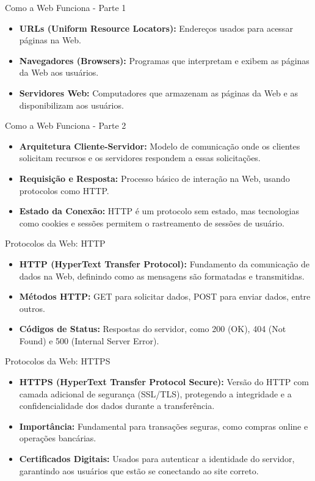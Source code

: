 \begin{frame}{Como a Web Funciona - Parte 1}
  \begin{itemize}
    \item \textbf{URLs (Uniform Resource Locators):} Endereços usados para acessar páginas na Web.
    \item \textbf{Navegadores (Browsers):} Programas que interpretam e exibem as páginas da Web aos usuários.
    \item \textbf{Servidores Web:} Computadores que armazenam as páginas da Web e as disponibilizam aos usuários.
  \end{itemize}
\end{frame}

\begin{frame}{Como a Web Funciona - Parte 2}
  \begin{itemize}
    \item \textbf{Arquitetura Cliente-Servidor:} Modelo de comunicação onde os clientes solicitam recursos e os servidores respondem a essas solicitações.
    \item \textbf{Requisição e Resposta:} Processo básico de interação na Web, usando protocolos como HTTP.
    \item \textbf{Estado da Conexão:} HTTP é um protocolo sem estado, mas tecnologias como cookies e sessões permitem o rastreamento de sessões de usuário.
  \end{itemize}
\end{frame}

\begin{frame}{Protocolos da Web: HTTP}
  \begin{itemize}
    \item \textbf{HTTP (HyperText Transfer Protocol):} Fundamento da comunicação de dados na Web, definindo como as mensagens são formatadas e transmitidas.
    \item \textbf{Métodos HTTP:} GET para solicitar dados, POST para enviar dados, entre outros.
    \item \textbf{Códigos de Status:} Respostas do servidor, como 200 (OK), 404 (Not Found) e 500 (Internal Server Error).
  \end{itemize}
\end{frame}

\begin{frame}{Protocolos da Web: HTTPS}
  \begin{itemize}
    \item \textbf{HTTPS (HyperText Transfer Protocol Secure):} Versão do HTTP com camada adicional de segurança (SSL/TLS), protegendo a integridade e a confidencialidade dos dados durante a transferência.
    \item \textbf{Importância:} Fundamental para transações seguras, como compras online e operações bancárias.
    \item \textbf{Certificados Digitais:} Usados para autenticar a identidade do servidor, garantindo aos usuários que estão se conectando ao site correto.
  \end{itemize}
\end{frame}


